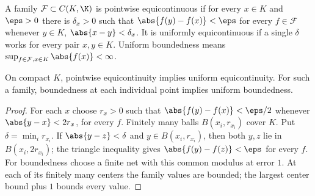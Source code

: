 \begin{definition}
A family $\mathcal F\subset C(K,\K)$ is pointwise equicontinuous if for every $x\in K$ and $\eps>0$ there is $\delta_x>0$ such that $\abs{f(y)-f(x)}<\eps$ for every $f\in\mathcal F$ whenever $y\in K$, $\abs{x-y}<\delta_x$. It is uniformly equicontinuous if a single $\delta$ works for every pair $x,y\in K$. Uniform boundedness means $\sup_{f\in\mathcal F,x\in K}\abs{f(x)}<\infty$.
\end{definition}
\begin{theorem}
On compact $K$, pointwise equicontinuity implies uniform equicontinuity. For such a family, boundedness at each individual point implies uniform boundedness.
\end{theorem}
\begin{proof}
For each $x$ choose $r_x>0$ such that $\abs{f(y)-f(x)}<\eps/2$ whenever $\abs{y-x}<2r_x$, for every $f$. Finitely many balls $B(x_i,r_{x_i})$ cover $K$. Put $\delta=\min_i r_{x_i}$. If $\abs{y-z}<\delta$ and $y\in B(x_i,r_{x_i})$, then both $y,z$ lie in $B(x_i,2r_{x_i})$; the triangle inequality gives $\abs{f(y)-f(z)}<\eps$ for every $f$. For boundedness choose a finite net with this common modulus at error $1$. At each of its finitely many centers the family values are bounded; the largest center bound plus $1$ bounds every value.
\end{proof}

